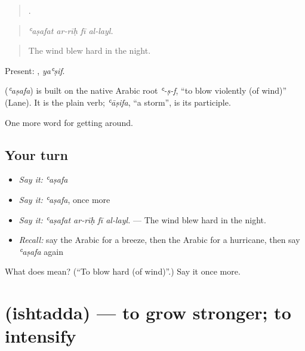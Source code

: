 \begin{quote}
   .
\end{quote}

\begin{quote}
\emph{ʿaṣafat ar-rīḥ fī al-layl.}
\end{quote}

\begin{quote}
The wind blew hard in the night.
\end{quote}

Present: , \emph{yaʿṣif}.

\begin{cousinweb}
\textbf{} (\emph{ʿaṣafa}) is built on the native Arabic root \emph{ʿ-ṣ-f}, \textquotedblleft{}to blow violently (of wind)\textquotedblright{} (Lane). It is the plain verb; \emph{ʿāṣifa}, \textquotedblleft{}a storm\textquotedblright{}, is its participle.
\end{cousinweb}

\begin{grammarlens}[title={What you've built}]
One more word for getting around.
\end{grammarlens}

\subsection*{Your turn}
\begin{itemize}
\raggedright
  \item \emph{Say it:} \emph{ʿaṣafa}
  \item \emph{Say it:} \emph{ʿaṣafa}, once more
  \item \emph{Say it:} \emph{ʿaṣafat ar-rīḥ fī al-layl.} — The wind blew hard in the night.
  \item \emph{Recall:} say the Arabic for a breeze, then the Arabic for a hurricane, then say \emph{ʿaṣafa} again
\end{itemize}

\begin{tcolorbox}[breakable,colback=teal!4,colframe=teal!35!black,title={Before you move on}]
What does  mean? (\textquotedblleft{}To blow hard (of wind)\textquotedblright{}.) Say it once more.
\end{tcolorbox}
\section[\texorpdfstring{\ar{اشتد} (ishtadda)}{اشتد (ishtadda)}]{ (ishtadda) — to grow stronger; to intensify}

